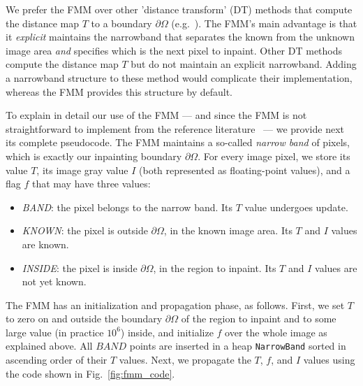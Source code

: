 \documentclass{llncs}
\begin{document}
We prefer the FMM over other 'distance transform' (DT) methods that compute the distance map $T$ to a boundary $\partial\Omega$
(e.g.~\cite{chamfer1,chamfer2,roerdinck}). The FMM's main advantage is that it
\textit{explicit} maintains the narrowband that
separates the known from the unknown image area \textit{and} specifies which is the next pixel to
inpaint. Other DT methods compute the distance map $T$ but do not maintain an
explicit narrowband. Adding a narrowband structure to these method would
complicate their implementation, whereas the FMM provides this structure by
default.

To explain in detail our use of the FMM  --- and since the FMM is not
straightforward to implement from the reference
literature~\cite{sethian,fmm_book} --- we provide next its complete pseudocode. 
  The FMM maintains a so-called \textit{narrow band} of pixels, which is
exactly our inpainting boundary $\partial\Omega$. For every image pixel, we store
its value $T$, its image gray value $I$ (both represented as floating-point
values),  and a flag $f$ that may have three values:
\begin{itemize}
  \item\textit{BAND}: the pixel belongs to the narrow band. Its $T$ value
  undergoes update.
  \item\textit{KNOWN}: the pixel is outside $\partial\Omega$, in the known
  image area. Its $T$ and $I$ values are known.
  \item\textit{INSIDE}: the pixel is inside $\partial\Omega$, in the region to inpaint. Its $T$
  and $I$ values are not yet known.
\end{itemize}
%
%
  The FMM has an initialization and propagation phase, as follows.
First, we set $T$ to zero on and outside the boundary
$\partial\Omega$ of the region to inpaint and to some large value (in practice $10^6$)
inside, and initialize $f$ over the whole image as explained
above. All $BAND$ points are inserted in a heap \texttt{NarrowBand}
sorted in ascending order of their $T$ values. 
Next, we propagate the $T$, $f$, and $I$ values using the code
shown in Fig.~\ref{fig:fmm_code}.
%
\end{document}
